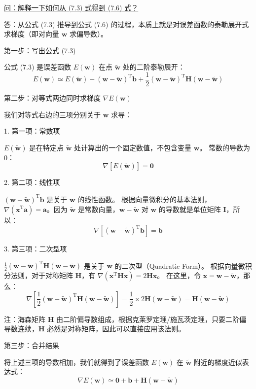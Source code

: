 \documentclass{article}
\begin{document}
{\color{blue}
\underline{问：解释一下如何从 (7.3) 式得到 (7.6) 式？}

答：从公式 (7.3) 推导到公式 (7.6) 的过程，本质上就是对误差函数的泰勒展开式求梯度（即对向量 $\mathbf{w}$ 求偏导数）。

第一步：写出公式 (7.3)

公式 (7.3) 是误差函数 $E(\mathbf{w})$ 在点 $\tilde{\mathbf{w}}$ 处的二阶泰勒展开：
$$E(\mathbf{w}) \simeq E(\tilde{\mathbf{w}}) + (\mathbf{w} - \tilde{\mathbf{w}})^\mathrm{T} \mathbf{b} + \frac{1}{2} (\mathbf{w} - \tilde{\mathbf{w}})^\mathrm{T} \mathbf{H} (\mathbf{w} - \tilde{\mathbf{w}})$$

第二步：对等式两边同时求梯度 $\nabla E(\mathbf{w})$

我们对等式右边的三项分别关于 $\mathbf{w}$ 求导：

1. 第一项：常数项

$E(\tilde{\mathbf{w}})$ 是在特定点 $\tilde{\mathbf{w}}$ 处计算出的一个固定数值，不包含变量 $\mathbf{w}$。
常数的导数为 0：
$$\nabla [E(\tilde{\mathbf{w}})] = \mathbf{0}$$

2. 第二项：线性项

$(\mathbf{w} - \tilde{\mathbf{w}})^\mathrm{T} \mathbf{b}$ 是关于 $\mathbf{w}$ 的线性函数。
根据向量微积分的基本法则，$\nabla (\mathbf{x}^\mathrm{T} \mathbf{a}) = \mathbf{a}$。因为 $\tilde{\mathbf{w}}$ 是常数向量，$\mathbf{w} - \tilde{\mathbf{w}}$ 对 $\mathbf{w}$ 的导数就是单位矩阵 $\mathbf{I}$，所以：
$$\nabla [(\mathbf{w} - \tilde{\mathbf{w}})^\mathrm{T} \mathbf{b}] = \mathbf{b}$$

3. 第三项：二次型项

$\frac{1}{2} (\mathbf{w} - \tilde{\mathbf{w}})^\mathrm{T} \mathbf{H} (\mathbf{w} - \tilde{\mathbf{w}})$ 是关于 $\mathbf{w}$ 的二次型（Quadratic Form）。
根据向量微积分法则，对于对称矩阵 $\mathbf{H}$，有 $\nabla (\mathbf{x}^\mathrm{T} \mathbf{H} \mathbf{x}) = 2\mathbf{H}\mathbf{x}$。
在这里，令 $\mathbf{x} = \mathbf{w} - \tilde{\mathbf{w}}$，那么：
$$\nabla \left[ \frac{1}{2} (\mathbf{w} - \tilde{\mathbf{w}})^\mathrm{T} \mathbf{H} (\mathbf{w} - \tilde{\mathbf{w}}) \right] = \frac{1}{2} \times 2\mathbf{H}(\mathbf{w} - \tilde{\mathbf{w}}) = \mathbf{H}(\mathbf{w} - \tilde{\mathbf{w}})$$

注：海森矩阵 $\mathbf{H}$ 由二阶偏导数组成，根据克莱罗定理/施瓦茨定理，只要二阶偏导数连续，$\mathbf{H}$ 必然是对称矩阵，因此可以直接应用该法则。

第三步：合并结果

将上述三项的导数相加，我们就得到了误差函数 $E(\mathbf{w})$ 在 $\tilde{\mathbf{w}}$ 附近的梯度近似表达式：
$$\nabla E(\mathbf{w}) \simeq \mathbf{0} + \mathbf{b} + \mathbf{H}(\mathbf{w} - \tilde{\mathbf{w}})$$

}
\end{document}
